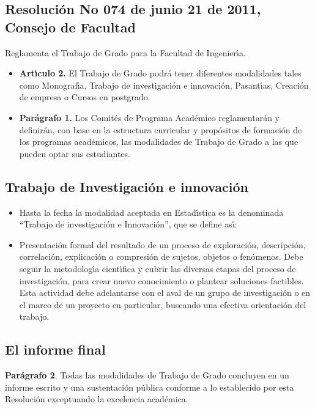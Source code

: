 \subsection{Resoluci\'{o}n No 074 de junio 21 de 2011, Consejo de Facultad}
Reglamenta el Trabajo de Grado para la Facultad de Ingenier\'{\i}a.
\begin{itemize}
\item \textbf{Art\'{\i}culo 2.} El Trabajo de Grado podr\'{a} tener diferentes
modalidades tales como Monograf\'{\i}a, Trabajo de investigaci\'{o}n e
innovaci\'{o}n, Pasant\'{\i}as, Creaci\'{o}n de empresa o Cursos en
postgrado.

\item \textbf{Par\'{a}grafo 1.} Los Comit\'{e}s de Programa Acad\'{e}mico reglamentar\'{a}n y definir\'{a}n, con base en la estructura curricular y prop\'{o}sitos de
formaci\'{o}n de los programas acad\'{e}micos, las modalidades de Trabajo de Grado a las que pueden optar sus estudiantes.
\end{itemize}

\subsection{Trabajo de Investigaci\'{o}n e innovaci\'{o}n}
\begin{itemize}
\item Hasta la fecha la modalidad aceptada en Estad\'{\i}stica es la
denominada ``Trabajo de investigaci\'{o}n e Innovaci\'{o}n'', que se
define as\'{\i}:
\item Presentaci\'{o}n formal del resultado de un proceso de exploraci\'{o}n,
descripci\'{o}n, correlaci\'{o}n, explicaci\'{o}n o compresi\'{o}n de sujetos,
objetos o fen\'{o}menos. Debe seguir la metodolog\'{\i}a cient\'{\i}fica y
cubrir las diversas etapas del proceso de investigaci\'{o}n, para crear
nuevo conocimiento o plantear soluciones factibles. Esta actividad
debe adelantarse con el aval de un grupo de investigaci\'{o}n o en el
marco de un proyecto en particular, buscando una efectiva
orientaci\'{o}n del trabajo.
\end{itemize}


\subsection{El informe final}
\textbf{Par\'{a}grafo 2}. Todas las modalidades de Trabajo de Grado concluyen
en un informe escrito y una sustentaci\'{o}n p\'{u}blica conforme a lo
establecido por esta Resoluci\'{o}n exceptuando la excelencia
acad\'{e}mica.

